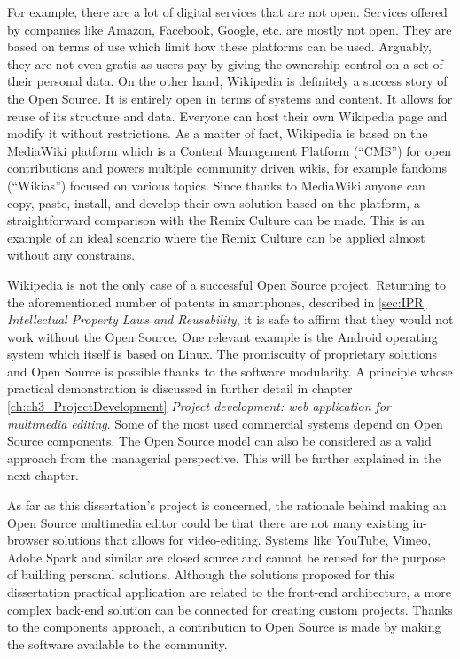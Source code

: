 For example, there are a lot of digital services that are not open. Services offered by companies like Amazon, Facebook, Google, etc. are mostly not open. They are based on terms of use which limit how these platforms can be used. Arguably, they are not even gratis as users pay by giving the ownership control on a set of their personal data.
On the other hand, Wikipedia is definitely a success story of the Open Source. It is entirely open in terms of systems and content. It allows for reuse of its structure and data. Everyone can host their own Wikipedia page and modify it without restrictions. As a matter of fact, Wikipedia is based on the MediaWiki platform which is a Content Management Platform (“CMS”) for open contributions and powers multiple community driven wikis, for example fandoms (“Wikias”) focused on various topics. Since thanks to MediaWiki anyone can copy, paste, install, and develop their own solution based on the platform, a straightforward comparison with the Remix Culture can be made. This is an example of an ideal scenario where the Remix Culture can be applied almost without any constrains.

Wikipedia is not the only case of a successful Open Source project. Returning to the aforementioned number of patents in smartphones, described in \ref{sec:IPR} \emph{Intellectual Property Laws and Reusability}, it is safe to affirm that they would not work without the Open Source. One relevant example is the Android operating system which itself is based on Linux. The promiscuity of proprietary solutions and Open Source is possible thanks to the software modularity. A principle whose practical demonstration is discussed in further detail in chapter \ref{ch:ch3_ProjectDevelopment} \emph{Project development: web application for multimedia editing}. Some of the most used commercial systems depend on Open Source components. The Open Source model can also be considered as a valid approach from the managerial perspective. This will be further explained in the next chapter.

As far as this dissertation’s project is concerned, the rationale behind making an Open Source multimedia editor could be that there are not many existing in-browser solutions that allows for video-editing. Systems like YouTube, Vimeo, Adobe Spark and similar are closed source and cannot be reused for the purpose of building personal solutions. Although the solutions proposed for this dissertation practical application are related to the front-end architecture, a more complex back-end solution can be connected for creating custom projects. Thanks to the components approach, a contribution to Open Source is made by making the software available to the community.

